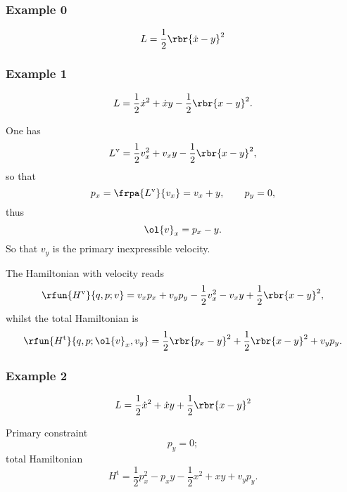 \documentclass[a4paper,11pt]{article}
\begin{document}
\subsubsection*{Example 0}
\cite[sec.\ 1.2]{Gitman1990}
\begin{equation}
L = \frac{1}{2}\rbr{\dot{x}-y}^2
\end{equation}


\subsubsection*{Example 1}
\begin{equation}
L = \frac{1}{2} \dot{x}^2 + \dot{x} y - \frac{1}{2}\rbr{x-y}^2.
\end{equation}

One has
\begin{equation}
L^\text{v} = \frac{1}{2} v_x^2 + v_x y - \frac{1}{2} \rbr{x-y}^2,
\end{equation}
so that
\begin{equation}
p_x = \frpa{L^\text{v}}{v_x} = v_x + y, \qquad p_y = 0,
\end{equation}
thus
\begin{equation}
\ol{v}_x = p_x - y.
\end{equation}
So that $v_y$ is the primary inexpressible velocity.

The Hamiltonian with velocity reads
\begin{equation}
\rfun{H^\text{v}}{q, p; v} = v_x p_x + v_y p_y - \frac{1}{2} v_x^2 - v_x y 
+ \frac{1}{2}\rbr{x-y}^2,
\end{equation}
whilst the total Hamiltonian is
\begin{equation}
\rfun{H^\text{t}}{q, p; \ol{v}_x, v_y} = \frac{1}{2}\rbr{p_x - y}^2 + 
\frac{1}{2} \rbr{x-y}^2 + v_y p_y.
\end{equation}

\subsubsection*{Example 2}

\begin{equation}
L = \frac{1}{2}\dot{x}^2 + \dot{x} y + \frac{1}{2}\rbr{x-y}^2
\end{equation}

Primary constraint
\begin{equation}
p_y = 0;
\end{equation}
total Hamiltonian
\begin{equation}
H^\text{t} = \frac{1}{2}p_x^2 - p_x y - \frac{1}{2} x^2 + xy + v_y p_y.
\end{equation}
\end{document}
